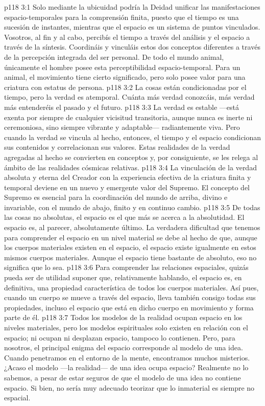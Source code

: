 \vs p118 3:1 Solo mediante la ubicuidad podría la Deidad unificar las manifestaciones espacio\hyp{}temporales para la comprensión finita, puesto que el tiempo es una sucesión de instantes, mientras que el espacio es un sistema de puntos vinculados. Vosotros, al fin y al cabo, percibís el tiempo a través del análisis y el espacio a través de la síntesis. Coordináis y vinculáis estos dos conceptos diferentes a través de la percepción integrada del ser personal. De todo el mundo animal, únicamente el hombre posee esta perceptibilidad espacio\hyp{}temporal. Para un animal, el movimiento tiene cierto significado, pero solo posee valor para una criatura con estatus de persona.
\vs p118 3:2 \pc La cosas están condicionadas por el tiempo, pero la verdad es atemporal. Cuánta más verdad conozcáis, más verdad  más entenderéis el pasado y el futuro.
\vs p118 3:3 La verdad es estable ---está exenta por siempre de cualquier vicisitud transitoria, aunque nunca es inerte ni ceremoniosa, sino siempre vibrante y adaptable--- radiantemente viva. Pero cuando la verdad se vincula al hecho, entonces, el tiempo y el espacio condicionan sus contenidos y correlacionan sus valores. Estas realidades de la verdad agregadas al hecho se convierten en conceptos y, por consiguiente, se les relega al ámbito de las realidades cósmicas relativas.
\vs p118 3:4 La vinculación de la verdad absoluta y eterna del Creador con la experiencia efectiva de la criatura finita y temporal deviene en un nuevo y emergente valor del Supremo. El concepto del Supremo es esencial para la coordinación del mundo de arriba, divino e invariable, con el mundo de abajo, finito y en continuo cambio.
\vs p118 3:5 \pc De todas las cosas no absolutas, el espacio es el que más se acerca a la absolutidad. El espacio es, al parecer, absolutamente último. La verdadera dificultad que tenemos para comprender el espacio en un nivel material se debe al hecho de que, aunque los cuerpos materiales existen en el espacio, el espacio existe igualmente en estos mismos cuerpos materiales. Aunque el espacio tiene bastante de absoluto, eso no significa que lo sea.
\vs p118 3:6 Para comprender las relaciones espaciales, quizás pueda ser de utilidad suponer que, relativamente hablando, el espacio es, en definitiva, una propiedad característica de todos los cuerpos materiales. Así pues, cuando un cuerpo se mueve a través del espacio, lleva también consigo todas sus propiedades, incluso el espacio que está en dicho cuerpo en movimiento y forma parte de él.
\vs p118 3:7 Todos los modelos de la realidad ocupan espacio en los niveles materiales, pero los modelos espirituales solo existen en relación con el espacio; ni ocupan ni desplazan espacio, tampoco lo contienen. Pero, para nosotros, el principal enigma del espacio corresponde al modelo de una idea. Cuando penetramos en el entorno de la mente, encontramos muchos misterios. ¿Acaso el modelo ---la realidad--- de una idea ocupa espacio? Realmente no lo sabemos, a pesar de estar seguros de que el modelo de una idea no contiene espacio. Si bien, no sería muy adecuado teorizar que lo inmaterial es siempre no espacial.
